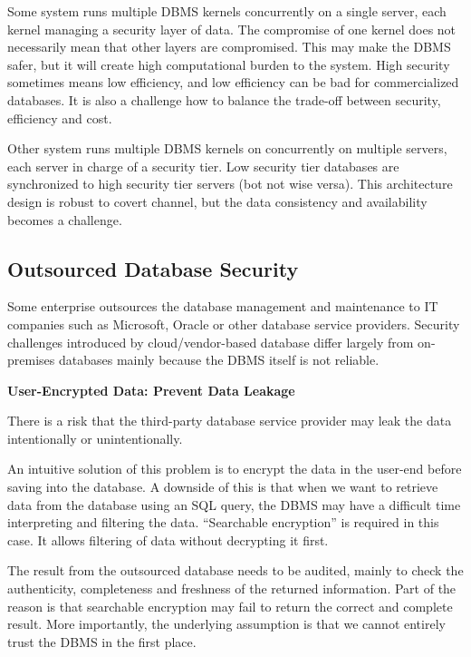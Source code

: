 Some system runs multiple DBMS kernels concurrently on a single server, each kernel managing a security layer of data. The compromise of one kernel does not necessarily mean that other layers are compromised. This may make the DBMS safer, but it will create high computational burden to the system. High security sometimes means low efficiency, and low efficiency can be bad for commercialized databases. It is also a challenge how to balance the trade-off between security, efficiency and cost.

Other system runs multiple DBMS kernels on concurrently on multiple servers, each server in charge of a security tier. Low security tier databases are synchronized to high security tier servers (bot not wise versa). This architecture design is robust to covert channel, but the data consistency and availability becomes a challenge.

\subsection{Outsourced Database Security}

Some enterprise outsources the database management and maintenance to IT companies such as Microsoft, Oracle or other database service providers. Security challenges introduced by cloud/vendor-based database differ largely from on-premises databases mainly because the DBMS itself is not reliable.

\vspace{0.1in}
\noindent \textbf{User-Encrypted Data: Prevent Data Leakage}
\vspace{0.1in}

There is a risk that the third-party database service provider may leak the data intentionally or unintentionally.

An intuitive solution of this problem is to encrypt the data in the user-end before saving into the database. A downside of this is that when we want to retrieve data from the database using an SQL query, the DBMS may have a difficult time interpreting and filtering the data. ``Searchable encryption'' is required in this case. It allows filtering of data without decrypting it first.

The result from the outsourced database needs to be audited, mainly to check the authenticity, completeness and freshness of the returned information. Part of the reason is that searchable encryption may fail to return the correct and complete result. More importantly, the underlying assumption is that we cannot entirely trust the DBMS in the first place.

